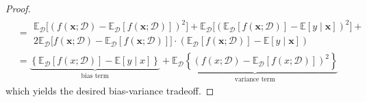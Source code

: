 \documentclass[10pt]{article} %
\begin{document}
\begin{proof}
\begin{equation}
\begin{split}
            & = \begin{multlined}
                \mathbb{E}_{\mathcal{D}} \Big[(f(\mathbf{x};\mathcal{D})-\mathbb{E}_{\mathcal{D}}[f(\mathbf{x};\mathcal{D})])^{2}\Big] + \mathbb{E}_{\mathcal{D}} \Big[ (\mathbb{E}_{\mathcal{D}} [f(\mathbf{x};\mathcal{D})] - \mathbb{E}[y\mid \mathbf{x}])^{2} \Big] + \\2\mathbb{E}_{\mathcal{D}}\Big[f(\mathbf{x};\mathcal{D})-\mathbb{E}_{\mathcal{D}}[f(\mathbf{x};\mathcal{D})]\Big]\cdot (\mathbb{E}_{\mathcal{D}}[f(\mathbf{x};\mathcal{D})]-\mathbb{E}[y\mid \mathbf{x}])
            \end{multlined} \\
            & = \underbrace{\left\{ \mathbb{E}_{\mathcal{D}}[f(x;\mathcal{D})] - \mathbb{E}[y\mid x] \right\}}_{\text{bias term}} + \underbrace{\mathbb{E}_{\mathcal{D}} \left\{(f(x;\mathcal{D})- \mathbb{E}_{\mathcal{D}}[f(x;\mathcal{D})])^{2}\right\}}_{\text{variance term}}
        \end{split}
    \end{equation}
    which yields the desired bias-variance tradeoff. 
\end{proof}
\end{document}
